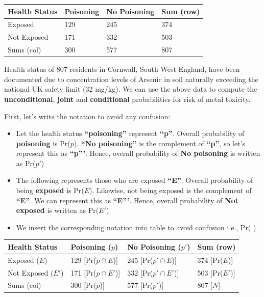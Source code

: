 \documentclass[
]{book}
\begin{document}
\begin{longtable}[]{@{}llll@{}}
\toprule
Health Status & Poisoning & No Poisoning & Sum (row) \\
\midrule
\endhead
Exposed & 129 & 245 & 374 \\
Not Exposed & 171 & 332 & 503 \\
Sums (col) & 300 & 577 & 807 \\
\bottomrule
\end{longtable}

Health status of 807 residents in Cornwall, South West England, have been documented due to concentration levels of Arsenic in soil naturally exceeding the national UK safety limit (32 mg/kg). We can use the above data to compute the \textbf{unconditional}, \textbf{joint} and \textbf{conditional} probabilities for risk of metal toxicity.

First, let's write the notation to avoid any confusion:

\begin{itemize}
\item
  Let the health status \textbf{``poisoning''} represent \textbf{``p''}. Overall probability of \textbf{poisoning} is Pr(\(p\)). \textbf{``No poisoning''} is the complement of \textbf{``p''}, so let's represent this as \textbf{``p'''}. Hence, overall probability of \textbf{No poisoning} is written as Pr(\(p'\))
\item
  The following represents those who are exposed \textbf{``E''}. Overall probability of being \textbf{exposed} is Pr(\(E\)). Likewise, not being exposed is the complement of \textbf{``E''}. We can represent this as \textbf{``E'''}. Hence, overall probability of \textbf{Not exposed} is written as Pr(\(E'\))
\item
  We insert the corresponding notation into table to avoid confusion i.e., Pr( )
\end{itemize}

\begin{longtable}[]{@{}llll@{}}
\toprule
Health Status & Poisoning (\(p\)) & No Poisoning (\(p'\)) & Sum (row) \\
\midrule
\endhead
Exposed (\(E\)) & 129 {[}Pr(\(p \cap E\)){]} & 245 {[}Pr(\(p' \cap E\)){]} & 374 {[}Pr(\(E\)){]} \\
Not Exposed (\(E'\)) & 171 {[}Pr(\(p \cap E'\)){]} & 332 {[}Pr(\(p' \cap E'\)){]} & 503 {[}Pr(\(E'\)){]} \\
Sums (col) & 300 {[}Pr(\(p\)){]} & 577 {[}Pr(\(p'\)){]} & 807 {[}\(N\){]} \\
\bottomrule
\end{longtable}
\end{document}
